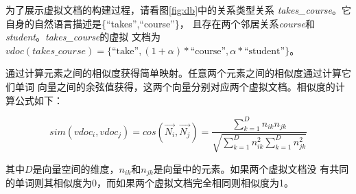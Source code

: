 为了展示虚拟文档的构建过程，请看图\ref{fig:db}中的关系类型关系
\emph{takes\_course}。它自身的自然语言描述是\{``takes'',``course''\}，
且存在两个邻居关系\emph{course}和\emph{student}。\emph{takes\_course}的虚拟
文档为$vdoc(takes\_course)=
\{\mbox{``take''},(1+\alpha)\ast\mbox{``course''},
\alpha\ast\mbox{``student''}
\}$。

通过计算元素之间的相似度获得简单映射。任意两个元素之间的相似度通过计算它们单词
向量之间的余弦值获得，这两个向量分别对应两个虚拟文档。相似度的计算公式如下：

\begin{equation}
sim(vdoc_i,vdoc_j)=cos(\overrightarrow{N_i},\overrightarrow{N_j})=\frac
	{\sum_{k=1}^{D}n_{ik}n_{jk}}
	{\sqrt{ \sum_{k=1}^{D}n_{ik}^{2} 
		\sum_{k=1}^{D}n_{jk}^{2}
	}}
\end{equation}

其中$D$是向量空间的维度，$n_{ik}$和$n_{jk}$是向量中的元素。如果两个虚拟文档没
有共同的单词则其相似度为0，而如果两个虚拟文档完全相同则相似度为1。
